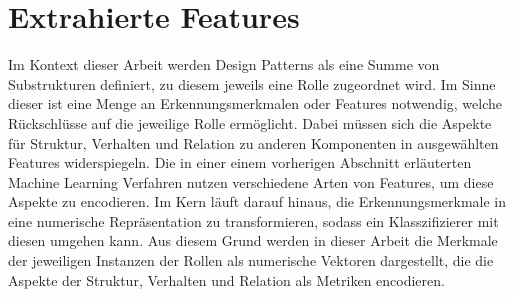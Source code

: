 \section{Extrahierte Features}

Im Kontext dieser Arbeit werden Design Patterns als eine Summe von Substrukturen definiert, zu diesem jeweils eine Rolle zugeordnet wird.
Im Sinne dieser ist eine Menge an Erkennungsmerkmalen oder Features notwendig, welche Rückschlüsse auf die jeweilige Rolle ermöglicht. 
Dabei müssen sich die Aspekte für Struktur, Verhalten und Relation zu anderen Komponenten in ausgewählten Features widerspiegeln.
Die in einer einem vorherigen Abschnitt erläuterten Machine Learning Verfahren nutzen verschiedene Arten von Features, um diese Aspekte zu encodieren.
Im Kern läuft darauf hinaus, die Erkennungsmerkmale in eine numerische Repräsentation zu transformieren, sodass ein Klasszifizierer mit diesen umgehen kann.
Aus diesem Grund werden in dieser Arbeit die Merkmale der jeweiligen Instanzen der Rollen als numerische Vektoren dargestellt, die die Aspekte der Struktur, Verhalten und Relation als Metriken encodieren.

